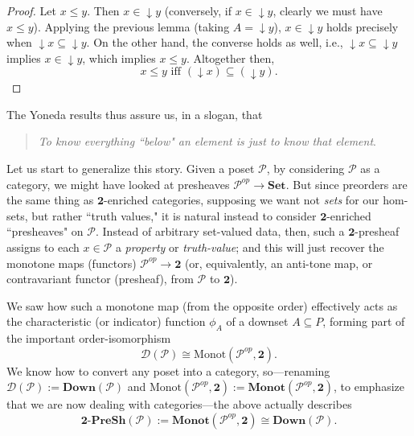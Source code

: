 \documentclass[11pt]{book}
\theoremstyle{definition}
\theoremstyle{definition}
\theoremstyle{definition}
\theoremstyle{theorem}
\theoremstyle{definition}
\begin{document}
\begin{proof}
	Let $x \leq y$. Then $x \in \downarrow y$ (conversely, if $x \in \downarrow y$, clearly we must have $x \leq y$). Applying the previous lemma (taking $A = \downarrow y$), $x \in \downarrow y$ holds precisely when $\downarrow x \subseteq  \downarrow y$. On the other hand, the converse holds as well, i.e., $\downarrow x \subseteq  \downarrow y$ implies $x \in \downarrow y$, which implies $x \leq y$. Altogether then, 
	\begin{equation}
	x \leq y \text{ iff } (\downarrow x) \subseteq  (\downarrow y ). 
	\end{equation}
\end{proof} \noindent 
The Yoneda results thus assure us, in a slogan, that 
\begin{quote}
	\textit{To know everything ``below" an element is just to know that element}. 
\end{quote}
Let us start to generalize this story. Given a poset $\mathcal{P}$, by considering $\mathcal{P}$ as a category, we might have looked at presheaves $\mathcal{P}^{op} \rightarrow \textbf{Set}$. But since preorders are the same thing as $\textbf{2}$-enriched categories, supposing we want not \textit{sets} for our hom-sets, but rather ``truth values," it is natural instead to consider $\textbf{2}$-enriched ``presheaves" on $\mathcal{P}$. Instead of arbitrary set-valued data, then, such a $\textbf{2}$-presheaf assigns to each $x \in \mathcal{P}$ a \textit{property} or \textit{truth-value}; and this will just recover the monotone maps (functors) $\mathcal{P}^{op} \rightarrow \textbf{2}$ (or, equivalently, an anti-tone map, or contravariant functor (presheaf), from $\mathcal{P}$ to $\textbf{2}$). \par 
We saw how such a monotone map (from the opposite order) effectively acts as the characteristic (or indicator) function $\phi_A$ of a downset $A \subseteq  P$, forming part of the important order-isomorphism 
\begin{equation*}
\mathcal{D}(\mathcal{P}) \cong \text{Monot}(\mathcal{P}^{op}, \textbf{2}). 
\end{equation*}   
We know how to convert any poset into a category, so---renaming $\mathcal{D}(\mathcal{P}) := \textbf{Down}(\mathcal{P})$ and $\text{Monot}(\mathcal{P}^{op}, \textbf{2}) := \textbf{Monot}(\mathcal{P}^{op}, \textbf{2})$, to emphasize that we are now dealing with categories---the above actually describes
\begin{equation*}
\textbf{2-PreSh}(\mathcal{P}) := \textbf{Monot}(\mathcal{P}^{op}, \textbf{2}) \cong \textbf{Down}(\mathcal{P}).
\end{equation*}  
\end{document}
